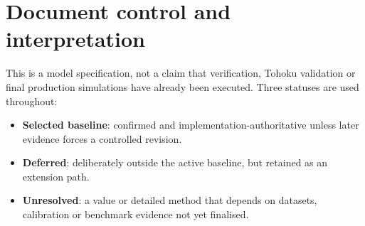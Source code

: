 \documentclass[11pt,a4paper]{article}
\begin{document}
\begin{abstract}
The active studentship model is a hybrid regional--local tsunami simulation framework. A two-dimensional, depth-averaged, finite-volume nonlinear shallow-water model propagates the 2011 Tohoku tsunami across an evidence-defined corridor. Its nearshore solution is transferred through a one-way replay interface to a local three-dimensional, incompressible, immiscible two-phase Reynolds-averaged Navier--Stokes model with volume-of-fluid free-surface capture. The local model resolves interaction with fixed rigid tsunami-defence geometries and produces hydrodynamic pressure, shear, force, moment, impulse, overtopping, run-up, transmission and energy diagnostics. The operational turbulence baseline is URANS with the $k$--$\omega$ SST closure; LES, deformable structures, scour, damage and machine-learning-based optimisation remain deferred. The regional numerical baseline is a cell-centred finite-volume method on unstructured triangular cells with a Rusanov flux, hydrostatic reconstruction, positivity-preserving wetting--drying treatment, explicit CFL-controlled time integration and open/relaxation boundaries. The local numerical baseline is a collocated finite-volume URANS--VOF algorithm with bounded compressive phase transport, Rhie--Chow face-flux interpolation and PISO-like pressure correction. This specification records all confirmed choices, required invariants and verification stages, while flagging exact corridor extents, final source datasets, sponge widths, coupling reconstruction details and mesh-resolution values as case-definition parameters that remain to be locked from data.
\end{abstract}

\tableofcontents
\newpage

\section*{Document control and interpretation}

This is a model specification, not a claim that verification, Tohoku validation or final production simulations have already been executed. Three statuses are used throughout:

\begin{itemize}
  \item \textbf{Selected baseline}: confirmed and implementation-authoritative unless later evidence forces a controlled revision.
  \item \textbf{Deferred}: deliberately outside the active baseline, but retained as an extension path.
  \item \textbf{Unresolved}: a value or detailed method that depends on datasets, calibration or benchmark evidence not yet finalised.
\end{itemize}
\end{document}
